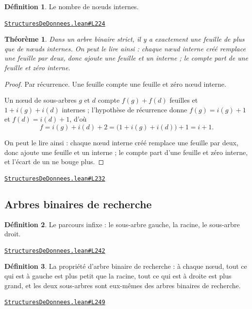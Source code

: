 \documentclass[11pt,a4paper]{article}
\theoremstyle{definition}
\newtheorem{definition}{Définition}
\theoremstyle{plain}
\newtheorem{theoreme}{Théorème}
\newcommand{\source}[2]{\par\smallskip\noindent\hfill{\footnotesize\href{#1}{\texttt{#2}}}\par\smallskip}
\begin{document}
\begin{definition}
Le nombre de nœuds internes.
\end{definition}
\source{https://github.com/Commutator-IO/learn-lean/blob/main/courses/02-lycee/11-informatique-nsi/StructuresDeDonnees.lean\#L224}{StructuresDeDonnees.lean\#L224}

\begin{theoreme}
Dans un arbre binaire strict, il y a exactement une feuille de plus que de nœuds
internes. On peut le lire ainsi : chaque nœud interne créé remplace une feuille par
deux, donc ajoute une feuille et un interne ; le compte part de une feuille et zéro
interne.
\end{theoreme}
\begin{proof}
Par récurrence. Une feuille compte une feuille et zéro nœud interne.

Un nœud de sous-arbres \(g\) et \(d\) compte \(f(g) + f(d)\) feuilles et
\(1 + i(g) + i(d)\) internes ; l'hypothèse de récurrence donne \(f(g) = i(g) + 1\) et
\(f(d) = i(d) + 1\), d'où
\[ f = i(g) + i(d) + 2 = \bigl(1 + i(g) + i(d)\bigr) + 1 = i + 1 . \]

On peut le lire ainsi : chaque nœud interne créé remplace une feuille par deux, donc
ajoute une feuille et un interne ; le compte part d'une feuille et zéro interne, et
l'écart de un ne bouge plus.
\end{proof}
\source{https://github.com/Commutator-IO/learn-lean/blob/main/courses/02-lycee/11-informatique-nsi/StructuresDeDonnees.lean\#L232}{StructuresDeDonnees.lean\#L232}

\subsection{Arbres binaires de recherche}

\begin{definition}
Le parcours infixe : le sous-arbre gauche, la racine, le sous-arbre droit.
\end{definition}
\source{https://github.com/Commutator-IO/learn-lean/blob/main/courses/02-lycee/11-informatique-nsi/StructuresDeDonnees.lean\#L242}{StructuresDeDonnees.lean\#L242}

\begin{definition}
La propriété d'arbre binaire de recherche : à chaque nœud, tout ce qui est à
gauche est plus petit que la racine, tout ce qui est à droite est plus grand, et les
deux sous-arbres sont eux-mêmes des arbres binaires de recherche.
\end{definition}
\source{https://github.com/Commutator-IO/learn-lean/blob/main/courses/02-lycee/11-informatique-nsi/StructuresDeDonnees.lean\#L249}{StructuresDeDonnees.lean\#L249}
\end{document}
